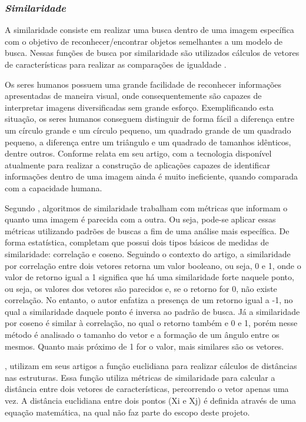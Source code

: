 \subsubsection{\textit{Similaridade}}

A similaridade consiste em realizar uma busca dentro de uma imagem específica com o objetivo de reconhecer/encontrar objetos semelhantes a um modelo de busca. Nessas funções de busca por similaridade são utilizados cálculos de vetores de características para realizar as comparações de igualdade \cite{MAIZA2013}.

Os seres humanos possuem uma grande facilidade de reconhecer informações apresentadas de maneira visual, onde consequentemente são capazes de interpretar imagens diversificadas sem grande esforço. Exemplificando esta situação, os seres humanos conseguem distinguir de forma fácil a diferença entre um círculo grande e um círculo pequeno, um quadrado grande de um quadrado pequeno, a diferença entre um triângulo e um quadrado de tamanhos idênticos, dentre outros. Conforme  relata em seu artigo, com a tecnologia disponível atualmente para realizar a construção de aplicações capazes de identificar informações dentro de uma imagem ainda é muito ineficiente, quando comparada com a capacidade humana.

Segundo , algoritmos de similaridade trabalham com métricas que informam o quanto uma imagem é parecida com a outra. Ou seja, pode-se aplicar essas métricas utilizando padrões de buscas a fim de uma análise mais específica. De forma estatística,  completam que possui dois tipos básicos de medidas de similaridade: correlação e coseno. Seguindo o contexto do artigo, a similaridade por correlação entre dois vetores retorna um valor booleano, ou seja, 0 e 1, onde o valor de retorno igual a 1 significa que há uma similaridade forte naquele ponto, ou seja, os valores dos vetores são parecidos e, se o retorno for 0, não existe correlação. No entanto, o autor enfatiza a presença de um retorno igual a -1, no qual a similaridade daquele ponto é inversa ao padrão de busca. Já a similaridade por coseno é similar à correlação, no qual o retorno também e 0 e 1, porém nesse método é analisado o tamanho do vetor e a formação de um ângulo entre os mesmos. Quanto mais próximo de 1 for o valor, mais similares são os vetores.

,  utilizam em seus artigos a função euclidiana para realizar cálculos de distâncias nas estruturas. Essa função utiliza métricas de similaridade para calcular a distância entre dois vetores de características, percorrendo o vetor apenas uma vez. A distância euclidiana entre dois pontos (Xi e Xj) é definida através de uma equação matemática, na qual não faz parte do escopo deste projeto.